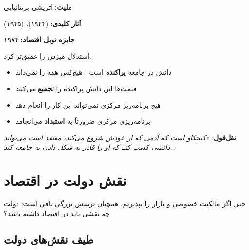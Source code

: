 \begin{personbox}

\textbf{ملیت:} اتریشی-بریتانیایی

\textbf{آثار کلیدی:}  (۱۹۴۴)،  (۱۹۴۵)

\textbf{جایزه نوبل اقتصاد:} ۱۹۷۴

\mediumspace

 استدلال میزس را عمیق‌تر کرد:
\begin{itemize}[nosep]
    \item دانش در جامعه \textbf{پراکنده} است—هیچ‌کس همه را نمی‌داند
    \item قیمت‌ها این دانش پراکنده را \textbf{تجمیع} می‌کنند
    \item هیچ برنامه‌ریز مرکزی نمی‌تواند این کار را انجام دهد
    \item برنامه‌ریزی مرکزی ضرورتاً به \textbf{استبداد} می‌انجامد
\end{itemize}

\mediumspace

\textbf{نقل‌قول:} \textit{«کنجکاو است که آدمی که از خودش شروع می‌کند، معتقد است می‌تواند دانشی کسب کند که او را قادر به شکل دادن به جامعه کند.»}
\end{personbox}

\section{نقش دولت در اقتصاد}

حتی اگر مالکیت خصوصی و بازار را بپذیریم، همچنان پرسش بزرگی باقی است: دولت چه نقشی باید در اقتصاد داشته باشد؟

\subsection{طیف نقش‌های دولت}

